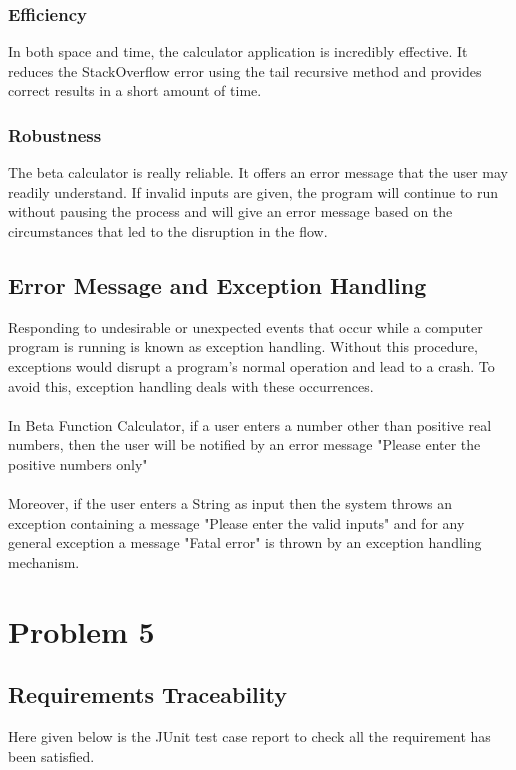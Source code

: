 \documentclass[12pt,a4paper]{report}
\begin{document}
\subsection{Efficiency}
In both space and time, the calculator application is incredibly effective. It reduces the StackOverflow error using the tail recursive method and provides correct results in a short amount of time.
\subsection{Robustness}
The beta calculator is really reliable. It offers an error message that the user may readily understand. If invalid inputs are given, the program will continue to run without pausing the process and will give an error message based on the circumstances that led to the disruption in the flow.

\newpage
\section{Error Message and Exception Handling}
Responding to undesirable or unexpected events that occur while a computer program is running is known as exception handling. Without this procedure, exceptions would disrupt a program's normal operation and lead to a crash. To avoid this, exception handling deals with these occurrences.\\\\
In Beta Function Calculator, if a user enters a number other than positive real numbers, then the user will be notified by an error message "Please enter the positive numbers only"\\\\
Moreover, if the user enters a String as input then the system throws an exception containing a message "Please enter the valid inputs" and for any general exception a message "Fatal error" is thrown by an exception handling mechanism.

\newpage

\chapter{Problem 5}

\section*{Requirements Traceability}
Here given below is the JUnit test case report to check all the requirement has been satisfied.
\end{document}
